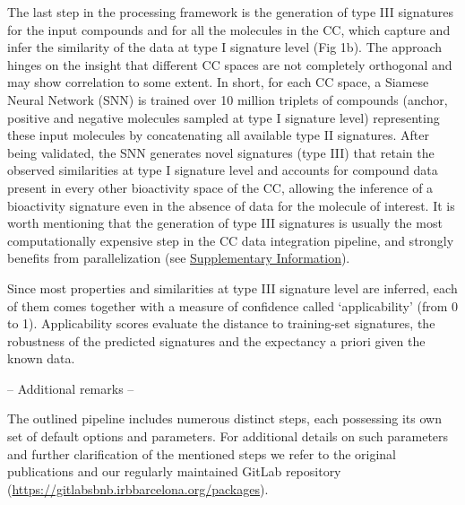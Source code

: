 The last step in the processing framework is the generation of type III signatures for the input compounds and for all the molecules in the CC, which capture and infer the similarity of the data at type I signature level (Fig 1b). The approach hinges on the insight that different CC spaces are not completely orthogonal and may show correlation to some extent. In short, for each CC space, a Siamese Neural Network (SNN) is trained over 10 million triplets of compounds (anchor, positive and negative molecules sampled at type I signature level) representing these input molecules by concatenating all available type II signatures. After being validated, the SNN generates novel signatures (type III) that retain the observed similarities at type I signature level and accounts for compound data present in every other bioactivity space of the CC, allowing the inference of a bioactivity signature even in the absence of data for the molecule of interest. It is worth mentioning that the generation of type III signatures is usually the most computationally expensive step in the CC data integration pipeline, and strongly benefits from parallelization (see \hyperref[Protocols_SupplementaryInformation]{Supplementary Information}).

Since most properties and similarities at type III signature level are inferred, each of them comes together with a measure of confidence called ‘applicability’ (from 0 to 1). Applicability scores evaluate the distance to training-set signatures, the robustness of the predicted signatures and the expectancy a priori given the known data. 

-- Additional remarks --

The outlined pipeline includes numerous distinct steps, each possessing its own set of default options and parameters. For additional details on such parameters and further clarification of the mentioned steps we refer to the original publications\cite{duran-frigola_extending_2020, bertoni_bioactivity_2021} and our regularly maintained GitLab repository (\hyperlink{https://gitlabsbnb.irbbarcelona.org/packages}{https://gitlabsbnb.irbbarcelona.org/packages}).